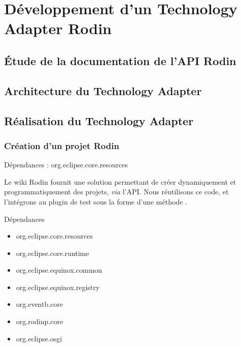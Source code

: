 \section{Développement d'un Technology Adapter Rodin}

\subsection{Étude de la documentation de l'API Rodin}

\subsection{Architecture du Technology Adapter}

\subsection{Réalisation du Technology Adapter}

\subsubsection{Création d'un projet Rodin}

Dépendances : org.eclipse.core.resources

Le wiki Rodin fournit une solution permettant de créer dynamiquement et programmatiquement des projets, \textit{via} l'API.
Nous réutilisons ce code, et l'intégrons au plugin de test sous la forme d'une méthode .



Dépendances

\begin{itemize}
    \item org.eclipse.core.resources
    \item org.eclipse.core.runtime
    \item org.eclipse.equinox.common
    \item org.eclipse.equinox.registry
    \item org.eventb.core
    \item org.rodinp.core
    \item org.eclipse.osgi
\end{itemize}
